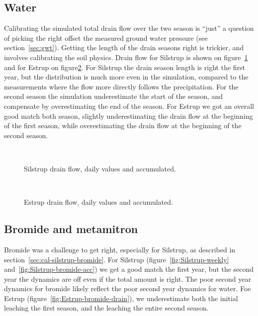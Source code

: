 \subsection{Water}

Calibrating the simulated total drain flow over the two season is
``just'' a question of picking the right offset the measured ground
water pressure (see section~\ref{sec:gwt}).  Getting the length of the
drain seasons right is trickier, and involves calibrating the soil
physics.  Drain flow for Silstrup is shown on
figure~\ref{fig:Silstrup-drain} and for Estrup on
figure\ref{fig:Estrup-drain}.  For Silstrup the drain season length is
right the first year, but the distribution is much more even in the
simulation, compared to the measurements where the flow more directly
follows the precipitation.  For the second season the simulation
underestimate the start of the season, and compensate by
overestimating the end of the season.  For Estrup we got an overall
good match both season, slightly underestimating the drain flow at the
beginning of the first season, while overestimating the drain flow at
the beginning of the second season.

\begin{figure}[htbp]
  \begin{center}
    \\
  \end{center}
  \caption{Silstrup drain flow, daily values and accumulated.}
  \label{fig:Silstrup-drain}
\end{figure}

\begin{figure}[htbp]
  \begin{center}
    \\
  \end{center}
  \caption{Estrup drain flow, daily values and accumulated.}
  \label{fig:Estrup-drain}
\end{figure}

\FloatBarrier
\subsection{Bromide and metamitron}

Bromide was a challenge to get right, especially for Silstrup, as
described in section~\ref{sec:cal-silstrup-bromide}.  For Silstrup
(figure~\ref{fig:Silstrup-weekly} and~\ref{fig:Silstrup-bromide-acc})
we get a good match the first year, but the second year the dynamics
are off even if the total amount is right.  The poor second year
dynamics for bromide likely reflect the poor second year dynamics for
water.  Foe Estrup (figure~\ref{fig:Estrup-bromide-drain}), we
underestimate both the initial leaching the first season, and the
leaching the entire second season.

